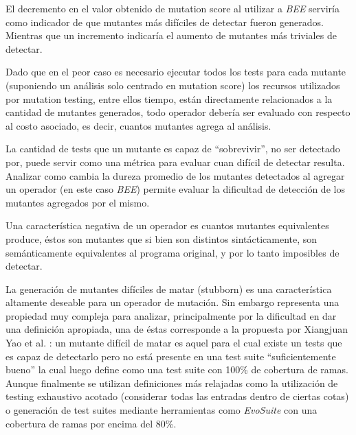 \begin{description}[leftmargin=8em,style=nextline]
	\item[Mutation score] El decremento en el valor obtenido de mutation score al utilizar a \emph{BEE} servir\'ia como indicador de que mutantes m\'as dif\'iciles de detectar fueron generados. Mientras que un incremento indicar\'ia el aumento de mutantes m\'as triviales de detectar.
	\item[Cantidad de mutantes] Dado que en el peor caso es necesario ejecutar todos los tests para cada mutante (suponiendo un an\'alisis solo centrado en mutation score) los recursos utilizados por mutation testing, entre ellos tiempo, est\'an directamente relacionados a la cantidad de mutantes generados, todo operador deber\'ia ser evaluado con respecto al costo asociado, es decir, cuantos mutantes agrega al an\'alisis.
	\item[Dureza (toughness)] La cantidad de tests que un mutante es capaz de ``sobrevivir'', no ser detectado por, puede servir como una m\'etrica para evaluar cuan dif\'icil de detectar resulta. Analizar como cambia la dureza promedio de los mutantes detectados al agregar un operador (en este caso \emph{BEE}) permite evaluar la dificultad de detecci\'on de los mutantes agregados por el mismo.
	\item[Mutantes equivalentes] Una caracter\'istica negativa de un operador es cuantos mutantes equivalentes produce, \'estos son mutantes que si bien son distintos sint\'acticamente, son sem\'anticamente equivalentes al programa original, y por lo tanto imposibles de detectar.
	\item[Mutantes dif\'iciles de matar (stubborn)] La generaci\'on de mutantes dif\'iciles de matar (stubborn) es una caracter\'istica altamente deseable para un operador de mutaci\'on. Sin embargo representa una propiedad muy compleja para analizar, principalmente por la dificultad en dar una definici\'on apropiada, una de \'estas corresponde a la propuesta por Xiangjuan Yao et al. \cite{bibliography.mutation.evaluation.stubborn}: un mutante dif\'icil de matar es aquel para el cual existe un tests que es capaz de detectarlo pero no est\'a presente en una test suite ``suficientemente bueno'' la cual luego define como una test suite con 100\% de cobertura de ramas. Aunque finalmente se utilizan definiciones m\'as relajadas como la utilizaci\'on de testing exhaustivo acotado (considerar todas las entradas dentro de ciertas cotas) o generaci\'on de test suites mediante herramientas como \emph{EvoSuite} con una cobertura de ramas por encima del 80\%.
\end{description}

